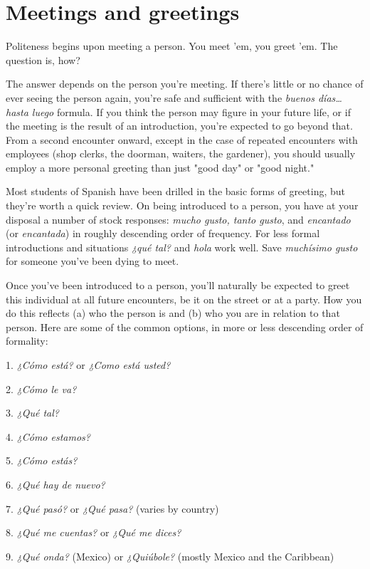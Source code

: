 \documentclass[14pt,a4paper,oneside]{memoir}
\newcommand{\bsk}{\vspace{20pt}}
\begin{document}
\section{Meetings and greetings}

Politeness begins upon meeting a person. You meet 'em, you
greet 'em. The question is, how?

The answer depends on the person you're meeting. If there's
little or no chance of ever seeing the person again, you're safe and sufficient with the \emph{buenos días\ldots{} hasta luego} formula. If you think the
person may figure in your future life, or if the meeting is the result of
an introduction, you're expected to go beyond that. From a second encounter onward, except in the case of repeated encounters with employees (shop clerks, the doorman, waiters, the gardener), you should
usually employ a more personal greeting than just "good day" or "good
night."

Most students of Spanish have been drilled in the basic forms
of greeting, but they're worth a quick review. On being introduced to a
person, you have at your disposal a number of stock responses: \emph{mucho
	gusto, tanto gusto}, and \emph{encantado} (or \emph{encantada}) in roughly descending order of frequency. For less formal introductions and situations
\emph{¿qué tal?} and \emph{hola} work well. Save \emph{muchísimo gusto} for someone
you've been dying to meet.

Once you've been introduced to a person, you'll naturally be
expected to greet this individual at all future encounters, be it on the
street or at a party. How you do this reflects (a) who the person is and
(b) who you are in relation to that person. Here are some of the common options, in more or less descending order of formality:

\bsk

1. \emph{¿Cómo está?} or \emph{¿Como está usted?}

2. \emph{¿Cómo le va?}

3. \emph{¿Qué tal?}

4. \emph{¿Cómo estamos?}

5. \emph{¿Cómo estás?}

6. \emph{¿Qué hay de nuevo?}

7. \emph{¿Qué pasó?} or \emph{¿Qué pasa?} (varies by country)

8. \emph{¿Qué me cuentas?} or \emph{¿Qué me dices?}

9. \emph{¿Qué onda?} (Mexico) or \emph{¿Quiúbole?} (mostly Mexico and
the Caribbean)
\end{document}

